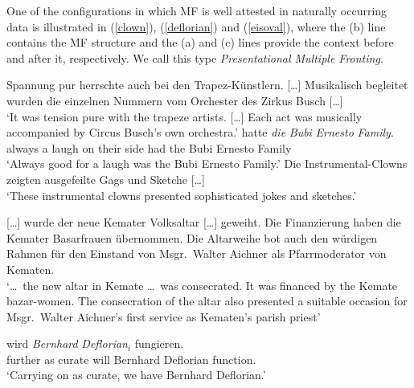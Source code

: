 One of the configurations in which MF is well attested in naturally occurring data is illustrated in
(\ref{clown}), (\ref{deflorian}) and (\ref{eisoval}), where the (b) line contains the MF structure and the (a) and
(c) lines provide the context before and after it, respectively. We call this type
\textit{Presentational Multiple Fronting}.


\begin{exe}\exnrfont
\ex\label{clown}
\begin{xlist}[iv.]

\ex Spannung pur herrschte auch bei den Trapez-Künstlern. [\ldots]  Musika\-lisch begleitet wurden die einzelnen Nummern vom Orchester des Zir\-kus Busch [\ldots]\\
    `It was tension pure with the trapeze artists. [\ldots] Each act was musically accompanied by Circus Busch's own orchestra.'
\ex\label{pres}
 hatte \textit{die} \textit{Bubi} \textit{Ernesto} \textit{Family}.\\
 \hspaceThis{[}always  \hspaceThis{[}a laugh  \hspaceThis{[}on their side had the Bubi Ernesto Family\\
\glt `Always good for a laugh was the Bubi Ernesto Family.'\label{clown-b}
\ex Die Instrumental-Clowns zeigten ausgefeilte Gags und Sketche [\ldots]\\
    `These instrumental clowns presented sophisticated jokes and sketches.'\\ 
\zl


\begin{exe}\exnrfont
\ex\label{deflorian}
\begin{xlist}[iv.]

    \ex {}[\ldots] wurde der neue Kemater Volksaltar [\ldots] geweiht. Die Finan\-zie\-rung haben
    die Kemater Basarfrauen übernommen.
    Die Altar\-wei\-he bot auch den würdigen Rahmen für den Einstand von Msgr.\ Walter Aichner als Pfarrmoderator von Kematen.\\
       `\ldots\ the new altar in Kemate \ldots\ was consecrated. It was financed by the Kemate bazar-women. The consecration of the altar also presented a suitable occasion for Msgr.\ Walter Aichner's first service as Kematen's parish priest'

 \ex {} wird \textit{Bernhard} \textit{Deflorian}$_i$ fungieren. \\
            \hspaceThis{[}further      \hspaceThis{[}as  curate        will Bernhard Deflorian function. \\
 \glt `Carrying on as curate, we have Bernhard Deflorian.'\label{deflorian-b}


\end{xlist}
\end{exe}
\end{xlist}
\end{exe}
